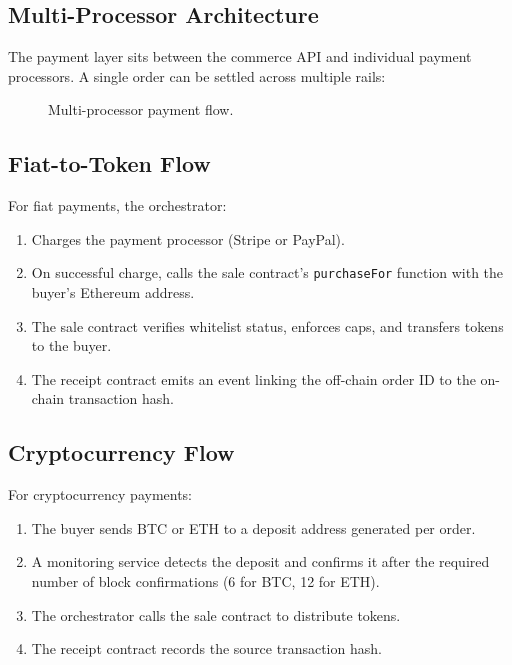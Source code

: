 \documentclass[11pt,a4paper]{article}
\begin{document}
\subsection{Multi-Processor Architecture}

The payment layer sits between the commerce API and individual payment processors. A single order can be settled across multiple rails:

\begin{figure}[h]
\centering
{}
\caption{Multi-processor payment flow.}
\end{figure}

\subsection{Fiat-to-Token Flow}

For fiat payments, the orchestrator:
\begin{enumerate}
    \item Charges the payment processor (Stripe or PayPal).
    \item On successful charge, calls the sale contract's \texttt{purchaseFor} function with the buyer's Ethereum address.
    \item The sale contract verifies whitelist status, enforces caps, and transfers tokens to the buyer.
    \item The receipt contract emits an event linking the off-chain order ID to the on-chain transaction hash.
\end{enumerate}

\subsection{Cryptocurrency Flow}

For cryptocurrency payments:
\begin{enumerate}
    \item The buyer sends BTC or ETH to a deposit address generated per order.
    \item A monitoring service detects the deposit and confirms it after the required number of block confirmations (6 for BTC, 12 for ETH).
    \item The orchestrator calls the sale contract to distribute tokens.
    \item The receipt contract records the source transaction hash.
\end{enumerate}
\end{document}
